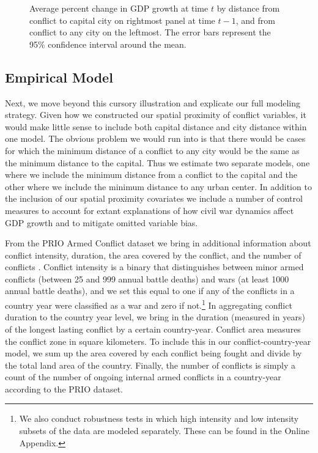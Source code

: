 \begin{figure}
	\centering
	\resizebox{.8\textwidth}{!}{}
	\caption{Average percent change in GDP growth at time $t$ by distance from conflict to capital city on rightmost panel at time $t-1$, and from conflict to any city on the leftmost. The error bars represent the 95\% confidence interval around the mean.}
	\label{fig:distGdp}
\end{figure}

\subsection{Empirical Model}

Next, we move beyond this cursory illustration and explicate our full modeling strategy. Given how we constructed our spatial proximity of conflict variables, it would make little sense to include both capital distance and city distance within one model. The obvious problem we would run into is that there would be cases for which the minimum distance of a conflict to any city would be the same as the minimum distance to the capital. Thus we estimate two separate models, one where we include the minimum distance from a conflict to the capital and the other where we include the minimum distance to any urban center. In addition to the inclusion of our spatial proximity covariates we include a number of control measures to account for extant explanations of how civil war dynamics affect GDP growth and to mitigate omitted variable bias. 

From the PRIO Armed Conflict dataset we bring in additional information about conflict intensity, duration, the area covered by the conflict, and the number of conflicts \citep{themner:wallensteen:2014}. Conflict intensity is a binary that distinguishes between minor armed conflicts (between 25 and 999 annual battle deaths) and wars (at least 1000 annual battle deaths), and we set this equal to one if any of the conflicts in a country year were classified as a war and zero if not.\footnote{We also conduct robustness tests in which high intensity and low intensity subsets of the data are modeled separately. These can be found in the Online Appendix.} In aggregating conflict duration to the country year level, we bring in the duration (measured in years) of the longest lasting conflict by a certain country-year. Conflict area measures the conflict zone in square kilometers. To include this in our conflict-country-year model, we sum up the area covered by each conflict being fought and divide by the total land area of the country. Finally, the number of conflicts is simply a count of the number of ongoing internal armed conflicts in a country-year according to the PRIO dataset.


